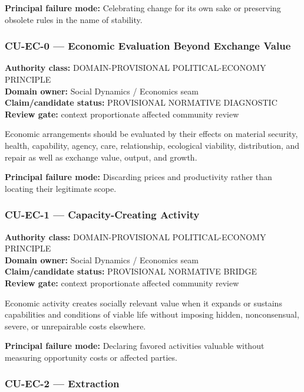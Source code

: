 \documentclass[
  11pt,
]{article}
\begin{document}
\textbf{Principal failure mode:} Celebrating change for its own sake or
preserving obsolete rules in the name of stability.

\subsubsection{CU-EC-0 --- Economic Evaluation Beyond Exchange
Value}\label{cu-ec-0-economic-evaluation-beyond-exchange-value}

\textbf{Authority class:} DOMAIN-PROVISIONAL POLITICAL-ECONOMY
PRINCIPLE\\
\textbf{Domain owner:} Social Dynamics / Economics seam\\
\textbf{Claim/candidate status:} PROVISIONAL NORMATIVE DIAGNOSTIC\\
\textbf{Review gate:} context proportionate affected community review

Economic arrangements should be evaluated by their effects on material
security, health, capability, agency, care, relationship, ecological
viability, distribution, and repair as well as exchange value, output,
and growth.

\textbf{Principal failure mode:} Discarding prices and productivity
rather than locating their legitimate scope.

\subsubsection{CU-EC-1 --- Capacity-Creating
Activity}\label{cu-ec-1-capacity-creating-activity}

\textbf{Authority class:} DOMAIN-PROVISIONAL POLITICAL-ECONOMY
PRINCIPLE\\
\textbf{Domain owner:} Social Dynamics / Economics seam\\
\textbf{Claim/candidate status:} PROVISIONAL NORMATIVE BRIDGE\\
\textbf{Review gate:} context proportionate affected community review

Economic activity creates socially relevant value when it expands or
sustains capabilities and conditions of viable life without imposing
hidden, nonconsensual, severe, or unrepairable costs elsewhere.

\textbf{Principal failure mode:} Declaring favored activities valuable
without measuring opportunity costs or affected parties.

\subsubsection{CU-EC-2 --- Extraction}\label{cu-ec-2-extraction}
\end{document}

